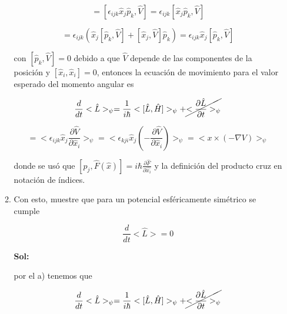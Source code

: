 \documentclass[12pt,a4paper]{article}
\begin{document}
\begin{enumerate}
\begin{enumerate}
    \begin{equation*}
        [\hat{L}_{i}, \hat{H}] = [\epsilon_{ijk}\hat{x}_{j}\hat{p}_{k}, \hat{V}] = \epsilon_{ijk} [\hat{x}_{j}\hat{p}_{k}, \hat{V}]
    \end{equation*}
    
    \begin{equation*}
        = \epsilon_{ijk} \left(\hat{x}_{j}[\hat{p}_{k}, \hat{V}] + [\hat{x}_{j}, \hat{V}] \hat{p}_{k}\right) = \epsilon_{ijk} \hat{x}_{j}[\hat{p}_{k}, \hat{V}]
    \end{equation*}
    
    con $[\hat{p}_{k}, \hat{V}]=0$ debido a que $\hat{V}$ depende de las componentes de la posición y $[\hat{x}_{i},\hat{x}_{i} ] = 0$, entonces la ecuación de movimiento para el valor esperado del momento angular es
    
    \begin{equation*}
        \frac{d}{dt} <\hat{L}>_{\psi} = \frac{1}{i \hbar} <[\hat{L}, \hat{H}]>_{\psi} +\cancel{<\frac{\partial \hat{L}}{\partial t}>_{\psi}}
    \end{equation*}
    
    \begin{equation*}
        = <\epsilon_{ijk}\hat{x}_{j} \frac{\partial \hat{V}}{\partial \hat{x}_{i}}>_{\psi}= <\epsilon_{kji}\hat{x}_{j} (-\frac{\partial \hat{V}}{\partial \hat{x}_{i}})>_{\psi} = <x \times (- \nabla V)>_{\psi}
    \end{equation*}
    
    donde se usó que $[p_{j}, \hat{F}(\hat{x})] = i \hbar \frac{\partial \hat{F}}{\partial \hat{x_{i}}}$ y la definición del producto cruz en notación de índices.
    
    
    \item Con esto, muestre que para un potencial esféricamente simétrico se cumple
    
    \begin{equation*}
        \frac{d}{dt} <\hat{L}> = 0
    \end{equation*}
    
    \textbf{Sol:}
    
    por el a) tenemos que
    
    \begin{equation*}
          \frac{d}{dt} <\hat{L}>_{\psi} = \frac{1}{i \hbar} <[\hat{L}, \hat{H}]>_{\psi} +\cancel{<\frac{\partial \hat{L}}{\partial t}>_{\psi}}
    \end{equation*}
    

\end{enumerate}
\end{enumerate}
\end{document}
